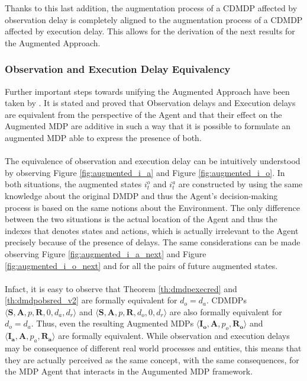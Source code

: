                 Thanks to this last addition, the augmentation process of a CDMDP affected by observation delay is completely aligned to the augmentation process of a CDMDP affected by execution delay. This allows for the derivation of the next results for the Augmented Approach.
            
            \subsubsection{Observation and Execution Delay Equivalency}
                \label{subsubs:delayeq}
                Further important steps towards unifying the Augmented Approach have been taken by . It is stated and proved that Observation delays and Execution delays are equivalent from the perspective of the Agent and that their effect on the Augmented MDP are additive in such a way that it is possible to formulate an augmented MDP able to express the presence of both.
                \\\\
                The equivalence of observation and execution delay can be intuitively understood by observing Figure \ref{fig:augmented_i_a} and Figure \ref{fig:augmented_i_o}. In both situations, the augmented states $i^o_t$ and $i^a_t$ are constructed by using the same knowledge about the original DMDP and thus the Agent's decision-making process is based on the same notions about the Environment. The only difference between the two situations is the actual location of the Agent and thus the indexes that denotes states and actions, which is actually irrelevant to the Agent precisely because of the presence of delays. The same considerations can be made observing Figure \ref{fig:augmented_i_a_next} and Figure \ref{fig:augmented_i_o_next} and for all the pairs of future augmented states.
                \\\\
                Infact, it is easy to observe that Theorem \ref{th:dmdpexecred} and \ref{th:dmdpobsred_v2} are formally equivalent for $d_o = d_a$. CDMDPs $\langle \mathbf{S}, \mathbf{A}, p, \mathbf{R}, 0, d_a, d_r \rangle$ and $\langle \mathbf{S}, \mathbf{A}, p, \mathbf{R}, d_o, 0, d_r \rangle$ are also formally equivalent for $d_o = d_a$. Thus, even the resulting Augmented MDPs $\langle \mathbf{I_o}, \mathbf{A}, p_o, \mathbf{R_o} \rangle$ and $\langle \mathbf{I_a}, \mathbf{A}, p_a, \mathbf{R_a} \rangle$ are formally equivalent. While observation and execution delays may be consequence of different real world processes and entities, this means that they are actually perceived as the same concept, with the same consequences, for the MDP Agent that interacts in the Augumented MDP framework.
